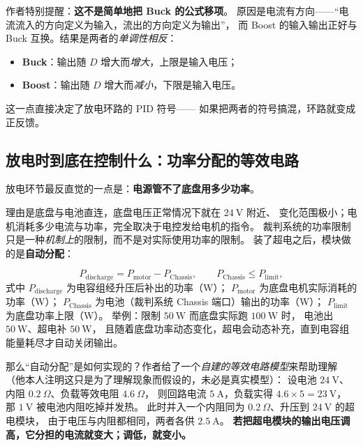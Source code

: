 \documentclass[cn,blue,11pt,device=normal]{elegantnote}
\begin{document}
作者特别提醒：\textbf{这不是简单地把 Buck 的公式移项}。
原因是电流有方向——“电流流入的方向定义为输入，流出的方向定义为输出”，
而 Boost 的输入输出正好与 Buck 互换。结果是两者的\emph{单调性相反}：

\begin{itemize}
  \item \textbf{Buck}：输出随 $D$ 增大而\emph{增大}，上限是输入电压；
  \item \textbf{Boost}：输出随 $D$ 增大而\emph{减小}，下限是输入电压。
\end{itemize}

这一点直接决定了放电环路的 PID 符号——
如果把两者的符号搞混，环路就变成正反馈。

\subsection{放电时到底在控制什么：功率分配的等效电路}

放电环节最反直觉的一点是：\textbf{电源管不了底盘用多少功率}。

理由是底盘与电池直连，底盘电压正常情况下就在 $24\ \mathrm{V}$ 附近、
变化范围极小；电机消耗多少电流与功率，完全取决于电控发给电机的指令。
裁判系统的功率限制只是一种\emph{机制上}的限制，而不是对实际使用功率的限制。
装了超电之后，模块做的是\textbf{自动分配}：

\begin{equation}\label{eq:dischargealloc}
  P_{\mathrm{discharge}} = P_{\mathrm{motor}} - P_{\mathrm{Chassis}},
  \qquad
  P_{\mathrm{Chassis}} \le P_{\mathrm{limit}} ,
\end{equation}
式中 $P_{\mathrm{discharge}}$ 为电容组经升压后补出的功率（W）；
$P_{\mathrm{motor}}$ 为底盘电机实际消耗的功率（W）；
$P_{\mathrm{Chassis}}$ 为电池（裁判系统 Chassis 端口）输出的功率（W）；
$P_{\mathrm{limit}}$ 为底盘功率上限（W）。
举例：限制 $50\ \mathrm{W}$ 而底盘实际跑 $100\ \mathrm{W}$ 时，
电池出 $50\ \mathrm{W}$、超电补 $50\ \mathrm{W}$，
且随着底盘功率动态变化，超电会动态补充，直到电容组能量耗尽才自动关闭输出。

那么“自动分配”是如何实现的？作者给了一个\emph{自建的等效电路模型}来帮助理解
（他本人注明这只是为了理解现象而假设的，未必是真实模型）：
设电池 $24\ \mathrm{V}$、内阻 $0.2\ \Omega$、负载等效电阻 $4.6\ \Omega$，
则回路电流 $5\ \mathrm{A}$，负载实得 $4.6\times5 = 23\ \mathrm{V}$，
那 $1\ \mathrm{V}$ 被电池内阻吃掉并发热。
此时并入一个内阻同为 $0.2\ \Omega$、升压到 $24\ \mathrm{V}$ 的超电模块，
由于电压与内阻都相同，两者各供 $2.5\ \mathrm{A}$。
\textbf{若把超电模块的输出电压调高，它分担的电流就变大；调低，就变小。}
\end{document}
